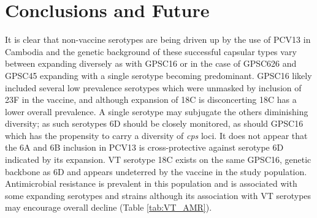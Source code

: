 \documentclass{article}
\begin{document}
\section{Conclusions and Future}
It is clear that non-vaccine serotypes are being driven up by the use of PCV13 in Cambodia and the genetic background of these successful capsular types vary between expanding diversely as with GPSC16 or in the case of GPSC626 and GPSC45 expanding with a single serotype becoming predominant. GPSC16 likely included several low prevalence serotypes which were unmasked by inclusion of 23F in the vaccine, and although expansion of 18C is disconcerting 18C has a lower overall prevalence. A single serotype may subjugate the others diminishing diversity; as such serotypes 6D should be closely monitored, as should GPSC16 which has the propensity to carry a diversity of \textit{cps} loci. It does not appear that the 6A and 6B inclusion in PCV13 is cross-protective against serotype 6D indicated by its expansion. VT serotype 18C exists on the same GPSC16, genetic backbone as 6D and appears undeterred by the vaccine in the study population. Antimicrobial resistance is prevalent in this population and is associated with some expanding serotypes and strains although its association with VT serotypes may encourage overall decline (Table \ref{tab:VT_AMR}). 
\begin{table}[hbt!]
\caption{Description of sample collection period, sex, age, and vaccine status for 686 healthy Cambodian children stratified by pre-PCV (N=258) and post-PCV13(N=428) }
\label{tab:descstats}
\end{table}
\end{document}
